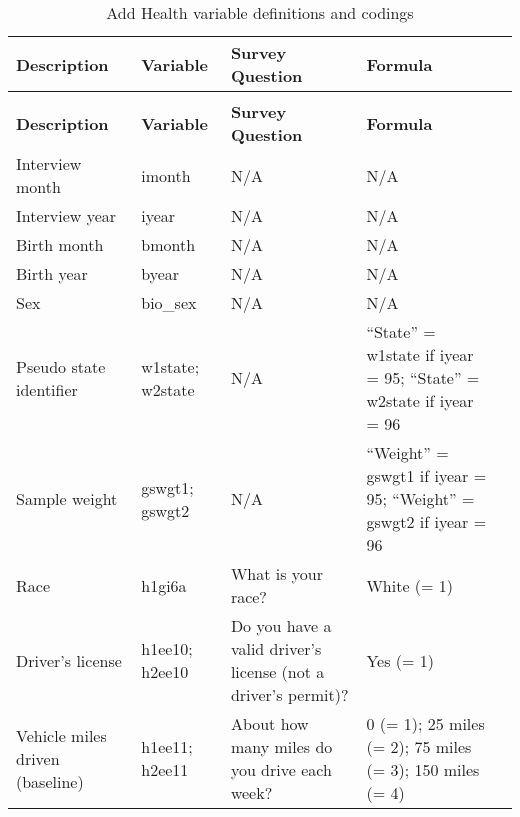 \documentclass[letterpaper,12pt]{article}
\newcommand\Tstrut{\rule{0pt}{2.6ex}}         %
\newcommand\Bstrut{\rule[-0.9ex]{0pt}{0pt}}   %
\begin{document}
\scriptsize

\begin{longtable}{P{.25\linewidth} P{.15\linewidth} P{.25\linewidth} P{.25\linewidth} P{.3\linewidth}}
\caption{Add Health variable definitions and codings}
\label{tab:appendix_data_addhealth} \\

\hline
\textbf{Description}  & \textbf{Variable} & \textbf{Survey Question} & \textbf{Formula} \Bstrut\\
\hline
\endfirsthead

\caption{Add Health variable definitions and codings} \\

\hline
\textbf{Description}  & \textbf{Variable} & \textbf{Survey Question} & \textbf{Formula} \Bstrut\\
\hline
\endhead

\hline
\endfoot
 
\hline
\endlastfoot

\hline
Interview month & 
imonth &
N/A &
N/A \Tstrut\\

Interview year & 
iyear &
N/A &
N/A \Tstrut\\

Birth month & 
bmonth &
N/A &
N/A \Tstrut\\

Birth year & 
byear &
N/A &
N/A \Tstrut\\

Sex & 
bio\_sex &
N/A &
N/A \Tstrut\\

Pseudo state identifier & 
w1state; w2state &
N/A &
\enquote{State} = w1state if iyear = 95; \enquote{State} = w2state if iyear = 96 \Tstrut\\

Sample weight & 
gswgt1; gswgt2 &
N/A &
\enquote{Weight} = gswgt1 if iyear = 95; \enquote{Weight} = gswgt2 if iyear = 96 \Tstrut\\

Race & 
h1gi6a &
What is your race? &
White (= 1) \Tstrut\\

Driver's license & 
h1ee10; h2ee10 &
Do you have a valid driver's license (not a driver's permit)? &
Yes (= 1) \Tstrut\\

Vehicle miles driven (baseline) & 
h1ee11; h2ee11 &
About how many miles do you drive each week? &
0 (= 1); 25 miles (= 2); 75 miles (= 3); 150 miles (= 4)  \Tstrut\\


\end{longtable}
\end{document}
